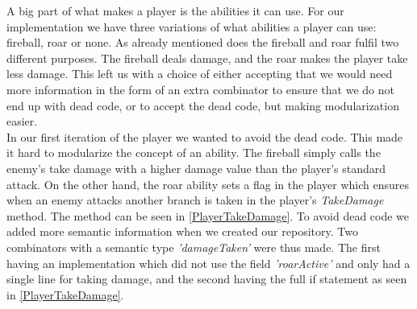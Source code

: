 A big part of what makes a player is the abilities it can use. For our implementation we have three variations of what abilities a player can use: fireball, roar or none. As already mentioned  does the fireball and roar fulfil two different purposes. The fireball deals damage, and the roar makes the player take less damage. This left us with a choice of either accepting that we would need more information in the form of an extra combinator to ensure that we do not end up with dead code, or to accept the dead code, but making modularization  easier.\\ 
In our first iteration of the player we wanted to avoid the dead code. This made it hard to modularize the concept of an ability. The fireball simply calls the enemy's take damage with a higher damage value than the player's standard attack. On the other hand, the roar ability sets a flag in the player which ensures when an enemy attacks another branch is taken in the player's \textit{TakeDamage} method. The method can be seen in \autoref{PlayerTakeDamage}. To avoid dead code we added more semantic information when we created our repository. Two combinators with a semantic type \textit{'damageTaken'} were thus made. The first having an implementation which did not use the field \textit{'roarActive'} and only had a single line for taking damage, and the second having the full if statement as seen in \autoref{PlayerTakeDamage}.

